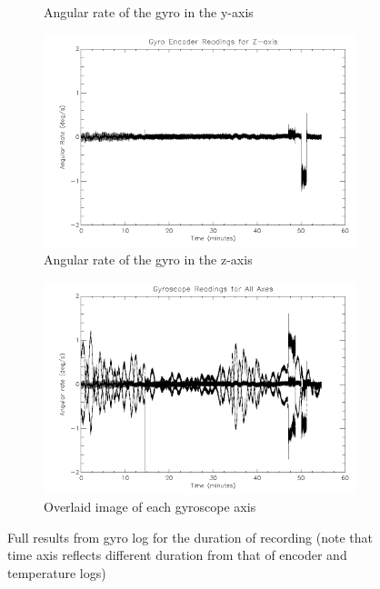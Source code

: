 \begin{figure}[htbp]
\begin{subfigure}{0.45\textwidth}
		\caption{Angular rate of the gyro in the y-axis}
		\label{fig:sub:gyroy}
	\end{subfigure}
	\begin{subfigure}{0.45\textwidth}
		\includegraphics[width=1\linewidth]{appendix/img/campaign_results/gyroz.png}
		\caption{Angular rate of the gyro in the z-axis}
		\label{fig:sub:gyroz}
	\end{subfigure}
	\begin{subfigure}{0.45\textwidth}
		\includegraphics[width=1\linewidth]{appendix/img/campaign_results/gyroall.png}
		\caption{Overlaid image of each gyroscope axis}
		\label{fig:sub:gyroall}
	\end{subfigure}
	\caption{Full results from gyro log for the duration of recording (note that time axis reflects different duration from that of encoder and temperature logs)}
	\label{fig:gyro}
\end{figure}

